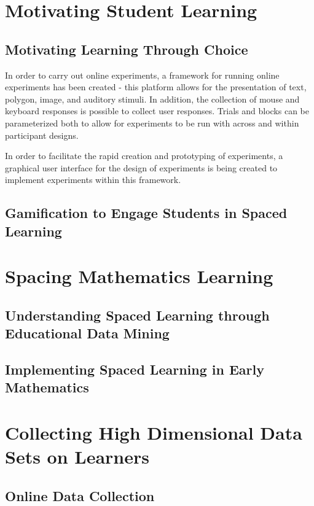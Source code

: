 \documentclass[12pt,a4paper,titlepage]{scrreprt}
\begin{document}
\section{Motivating Student Learning}
\subsection{Motivating Learning Through Choice}
In order to carry out online experiments, a framework for running online experiments has been created - this platform allows for the presentation of text, polygon, image, and auditory stimuli. In addition, the collection of mouse and keyboard responses is possible to collect user responses. Trials and blocks can be parameterized both to allow for experiments to be run with across and within participant designs.

In order to facilitate the rapid creation and prototyping of experiments, a graphical user interface for the design of experiments is being created to implement experiments within this framework. 

\subsection{Gamification to Engage Students in Spaced Learning}

\section{Spacing Mathematics Learning}

\subsection{Understanding Spaced Learning through Educational Data Mining}

\subsection{Implementing Spaced Learning in Early Mathematics}

\section{Collecting High Dimensional Data Sets on Learners}

\subsection{Online Data Collection}
\end{document}
